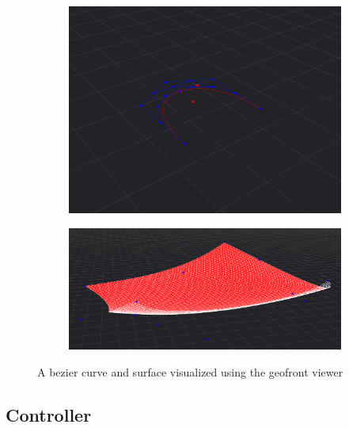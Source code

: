 \begin{figure}
  \centering
  \begin{subfigure}[b]{0.45\linewidth}
    \graphicspath{ {../../assets/images/implementation/} }
    \centering
    \includegraphics[width=\linewidth]{viewer-2.png}
    \caption{}\label{fig:viewer-geometries:1}
  \end{subfigure}%
  \qquad 
  \begin{subfigure}[b]{0.45\linewidth}
    \graphicspath{ {../../assets/images/implementation/} }
    \centering
    \includegraphics[width=\linewidth]{viewer-3.png}
    \caption{}\label{fig:viewer-geometries:2}
  \end{subfigure}%
  \caption[Geofront viewer geometries]{A bezier curve and surface visualized using the geofront viewer}
  \label{fig:viewer-geometries}
\end{figure}

\subsection{Controller}

